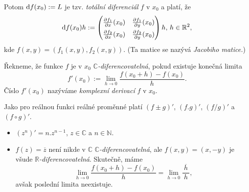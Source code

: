 \begin{note}

Potom $\mathop{}\!\mathrm{d} f(x_0):=L$ je tzv. \emph{totální diferenciál} $f$ v $x_0$ a platí, že $$\diff f(x_0)h:=
\renewcommand\arraystretch{1.5}
\begin{pmatrix}
\frac{\partial f_1}{\partial x}(x_0) & \frac{\partial f_1}{\partial y}(x_0)\\
\frac{\partial f_2}{\partial x}(x_0) & \frac{\partial f_2}{\partial y}(x_0)
\end{pmatrix}h\text{, }h\in \mathbb{R}^2\text{,}$$
kde $f(x,y) = (f_1(x,y),f_2(x,y)).$ (Ta matice se nazývá \emph{Jacobiho matice.})
\end{note} 


\begin{definition}
Řekneme, že funkce $f$ je v $x_0$ $\mathbb{C}$\emph{-diferencovatelná}, pokud existuje konečná limita $$f'(x_0):= \lim_{h \to 0}\frac{f(x_0+h)-f(x_0)}{h}.$$ 
Číslo $f'(x_0)$ nazýváme \emph{komplexní derivací} $f$ v $x_0$. 

\end{definition}  

\begin{note}
Jako pro reálnou funkci reálné proměnné platí $(f\pm g)'$, $(f.g)'$, $(f/g)'$ a $(f\circ g)'$.

\end{note} 

\begin{example}\mbox{}
\begin{itemize}
    \item $(z^n)' = n.z^{n-1}$, $z\in \mathbb{C}$ a $n\in \mathbb{N}\text{.}$
    \item $f(z) = \overline{z}$ není nikde v $\mathbb{C}$ $\mathbb{C}$\emph{-diferencovatelná}, ale $f(x,y) = (x,-y)$ je všude $\mathbb{R}$\emph{-diferencovatelná}. Skutečně, máme $$\lim_{h\to 0}\frac{f(x_0+h)-f(x_0)}{h} = \lim_{h\to 0}\frac{\ \overline{h}\ }{h}\text{,}$$ avšak poslední limita neexistuje. 
    \end{itemize}
\end{example}


